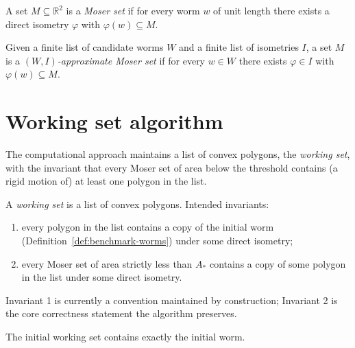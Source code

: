 \begin{definition}
  \label{def:moser-set}
  A set $M \subseteq \mathbb{R}^2$ is a \emph{Moser set} if for every
  worm $w$ of unit length there exists a direct isometry $\varphi$ with
  $\varphi(w) \subseteq M$.
\end{definition}

\begin{definition}
  \label{def:approx-moser-set}
  Given a finite list of candidate worms $W$ and a finite list of
  isometries $I$, a set $M$ is a \emph{$(W, I)$-approximate Moser set} if
  for every $w \in W$ there exists $\varphi \in I$ with
  $\varphi(w) \subseteq M$.
\end{definition}

\chapter{Working set algorithm}

The computational approach maintains a list of convex polygons, the
\emph{working set}, with the invariant that every Moser set of area
below the threshold contains (a rigid motion of) at least one polygon in
the list.

\begin{definition}
  \label{def:workingSet}
  \leanok
  A \emph{working set} is a list of convex polygons. Intended invariants:
  \begin{enumerate}
    \item every polygon in the list contains a copy of the initial worm
      (Definition~\ref{def:benchmark-worms}) under some direct isometry;
    \item every Moser set of area strictly less than $A_*$ contains a
      copy of some polygon in the list under some direct isometry.
  \end{enumerate}
  Invariant 1 is currently a convention maintained by construction;
  Invariant 2 is the core correctness statement the algorithm preserves.
\end{definition}

\begin{definition}
  \label{def:initialWorkingSet}
  \leanok
  The initial working set contains exactly the initial worm.
\end{definition}

